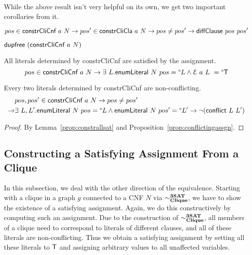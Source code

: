\documentclass[a4paper,UKenglish,cleveref, autoref]{lipics-v2019}
\newcommand{\TODO}[1]{}
\begin{document}
While the above result isn't very helpful on its own, we get two important corollaries from it.

\begin{corollary}
  \[ pos \in \normalfont\textsf{constrCliCnf}~a~N \rightarrow pos' \in \normalfont\textsf{constrCliCla}~a~N \rightarrow pos \neq pos' \rightarrow \normalfont\textsf{diffClause}~pos~pos' \]
\end{corollary}

\begin{corollary}
   $\normalfont\textsf{dupfree}~(\normalfont\textsf{constrCliCnf}~a~N)$
\end{corollary}

\begin{lemma}\label{prop:constrallsat}
  All literals determined by \normalfont\textsf{constrCliCnf} are satisfied by the assignment.
  \[ pos \in \normalfont\textsf{constrCliCnf}~a~N \rightarrow \exists~L. \normalfont\textsf{enumLiteral}~N~pos = \degree L \land \mathcal{E}~a~L~ = \degree\mathsf{T} \]
\end{lemma}
\TODO{
\begin{proof}
\end{proof}
}

\begin{proposition}
  Every two literals determined by \normalfont\textsf{constrCliCnf} are non-conflicting.
  \begin{align*}
    &pos, pos' \in \normalfont\textsf{constrCliCnf}~a~N \rightarrow pos \neq pos' \\
    \rightarrow& \exists~L,L'. \normalfont\textsf{enumLiteral}~N~pos = \degree L \land \normalfont\textsf{enumLiteral}~N~pos' = \degree L' \rightarrow \lnot{(\normalfont\textsf{conflict}~L~L')} 
 \end{align*}
\end{proposition}
\begin{proof}
  By Lemma~\ref{prop:constrallsat} and Proposition~\ref{prop:conflictingassgn}.
\end{proof}

\subsection{Constructing a Satisfying Assignment From a Clique}
In this subsection, we deal with the other direction of the equivalence. Starting with a clique in a graph $g$ connected to a CNF $N$ via $\sim^{\textbf{3SAT}}_{\textbf{Clique}}$, we have to show the existence of a satisfying assignment. Again, we do this constructively by computing such an assignment. Due to the construction of $\sim^{\textbf{3SAT}}_{\textbf{Clique}}$, all members of a clique need to correspond to literals of different clauses, and all of these literals are non-conflicting. Thus we obtain a satisfying assignment by setting all these literals to $\mathsf{T}$ and assigning arbitrary values to all unaffected variables. 
\end{document}
